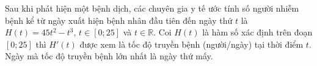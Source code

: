 \begin{ex}[Mức độ H]%
	Sau khi phát hiện một bệnh dịch, các chuyên gia y tế ước tính số người nhiễm bệnh kể từ ngày xuất hiện bệnh nhân đầu tiên đến ngày thứ $t$ là $H(t)=45t^2-t^3\text{, }t \in [0;25]$ và $t\in \mathbb{R}$. Coi $H(t)$ là hàm số xác định trên đoạn $[0;25]$ thì $H'(t)$ được xem là tốc độ truyền bệnh (người/ngày) tại thời điểm $t$. Ngày mà tốc độ truyền bệnh lớn nhất là ngày thứ mấy.
\end{ex}


